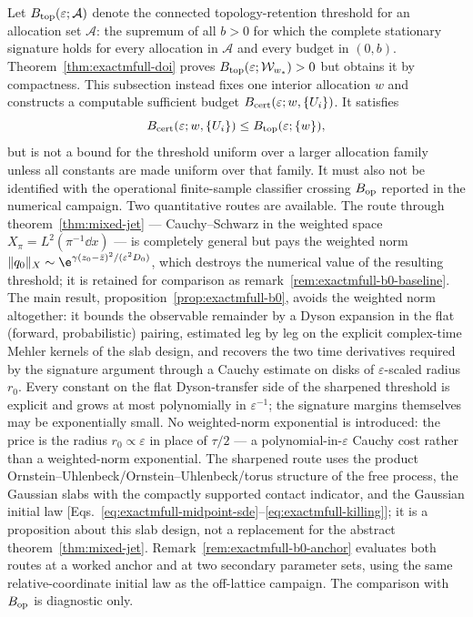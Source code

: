 Let \(B_{\rm top}(\varepsilon;\mathcal A)\) denote the connected
topology-retention threshold for an allocation set \(\mathcal A\): the
supremum of all \(b>0\) for which the complete stationary signature holds for
every allocation in \(\mathcal A\) and every budget in \((0,b)\).
Theorem~\ref{thm:exactmfull-doi} proves
\(B_{\rm top}(\varepsilon;\mathcal W_{w_*})>0\) but obtains it by compactness.
This subsection instead fixes one interior allocation \(w\) and constructs a
computable sufficient budget \(B_{\rm cert}(\varepsilon;w,\{U_i\})\).  It
satisfies
\begin{equation}
 B_{\rm cert}(\varepsilon;w,\{U_i\})
 \le B_{\rm top}(\varepsilon;\{w\}),
 \label{eq:exactmfull-bcert-relation}
\end{equation}
but is not a bound for the threshold uniform over a larger allocation family
unless all constants are made uniform over that family.  It must also not be
identified with the operational finite-sample classifier crossing
\(B_{\rm op}\) reported in the numerical campaign.  Two
quantitative routes are available.  The route through
theorem~\ref{thm:mixed-jet} --- Cauchy--Schwarz in the weighted space
\(X_\pi=L^2(\pi^{-1}\dd x)\) --- is completely general but pays the weighted
norm \(\|q_0\|_X\sim\e^{\gamma(z_0-\bar z)^2/(\varepsilon^2D_0)}\), which
destroys the numerical value of the resulting threshold; it is retained for
comparison as remark~\ref{rem:exactmfull-b0-baseline}.  The main result,
proposition~\ref{prop:exactmfull-b0}, avoids the weighted norm altogether:
it bounds the observable remainder by a Dyson expansion in the flat
(forward, probabilistic) pairing, estimated leg by leg on the explicit
complex-time Mehler kernels of the slab design, and recovers the two time
derivatives required by the signature argument through a Cauchy estimate on
disks of \(\varepsilon\)-scaled radius \(r_0\).  Every constant on the flat
Dyson-transfer side of the sharpened threshold is explicit and grows at most
polynomially in \(\varepsilon^{-1}\); the signature margins themselves may be
exponentially small.  No weighted-norm exponential is introduced: the price is
the radius \(r_0\propto\varepsilon\) in place of \(\tau/2\) --- a
polynomial-in-\(\varepsilon\) Cauchy cost rather than a weighted-norm
exponential.  The sharpened route uses
the product Ornstein--Uhlenbeck/Ornstein--Uhlenbeck/torus structure of the
free process, the Gaussian slabs with the compactly supported contact
indicator, and the Gaussian initial law
[Eqs.~\eqref{eq:exactmfull-midpoint-sde}--\eqref{eq:exactmfull-killing}];
it is a proposition about this slab design, not a replacement for the
abstract theorem~\ref{thm:mixed-jet}.
Remark~\ref{rem:exactmfull-b0-anchor} evaluates both routes at a worked
anchor and at two secondary parameter sets, using the same relative-coordinate
initial law as the off-lattice campaign.  The comparison with \(B_{\rm op}\)
is diagnostic only.

